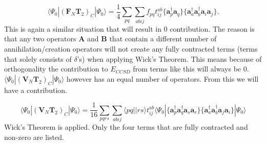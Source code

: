 \begin{equation}
\langle \Psi_0 | (\textbf{F}_N \textbf{T}_2)_C | \Psi_0 \rangle = \frac{1}{4} \sum_{pq} \sum_{abij} f_{pq} t_{ij}^{ab} \{ \textbf{a}^{\dag}_p \textbf{a}_q \}
\{ \textbf{a}^{\dag}_a \textbf{a}^{\dag}_b \textbf{a}_i \textbf{a}_j \} .
\end{equation}
This is again a similar situation that will result in 0 contribution. The reason is that any two operators $\textbf{A}$ and $\textbf{B}$ that contain a different number of annihilation/creation operators will not create any fully contracted terms (terms that solely consists of $\delta$'s) when applying Wick's Theorem. This means because of orthogonality the contribution to $E_{CCSD}$ from terms like this will always be 0. \\

$\langle \Psi_0 | (\textbf{V}_N \textbf{T}_2)_C | \Psi_0 \rangle$ however has an equal number of operators. From this we will have a contribution.

\begin{equation}
\langle \Psi_0 | (\textbf{V}_N \textbf{T}_2)_C | \Psi_0 \rangle = \frac{1}{16} \sum_{pqrs} \sum_{abij} \langle pq||rs \rangle t_{ij}^{ab} \langle \Psi_0|
\{
\textbf{a}^{\dag}_p \textbf{a}^{\dag}_q
\textbf{a}_s \textbf{a}_r \}
\{
\textbf{a}^{\dag}_a \textbf{a}^{\dag}_b
\textbf{a}_j \textbf{a}_i \}
| \Psi_0 \rangle \nonumber
\end{equation}
Wick's Theorem is applied. Only the four terms that are fully contracted and non-zero are listed.

